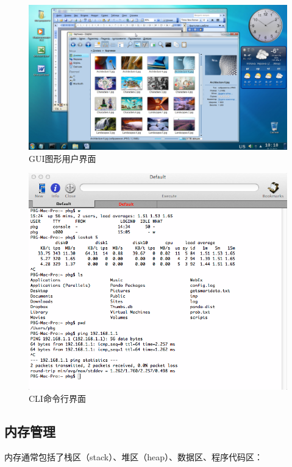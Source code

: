 \begin{figure}[H]
    \centering
    \includegraphics[]{img/C2/2-1/2.png}
    \caption{GUI图形用户界面}
\end{figure}

\begin{figure}[H]
    \centering
    \includegraphics[scale=0.5]{img/C2/2-1/3.png}
    \caption{CLI命令行界面}
\end{figure}

\vspace{0.5cm}

\subsection{内存管理}

内存通常包括了栈区（stack）、堆区（heap）、数据区、程序代码区：

